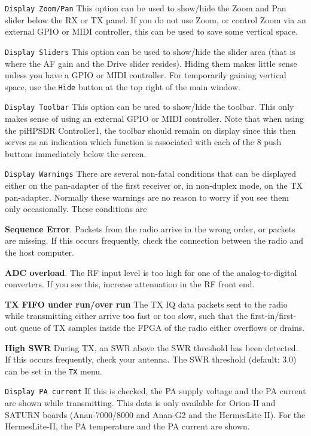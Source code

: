 \documentclass[12pt]{book}
\def\rett#1{\texttt{\color{red}#1}}
\def\bltt#1{\texttt{\color{blue}#1}}
\def\pH{pi\-HPSDR\xspace}
\begin{document}
 \rett{Display Zoom/Pan} This option can be used to show/hide the Zoom and
 Pan slider below the RX or TX panel. If you do not use Zoom, or control
 Zoom via an external GPIO or MIDI controller, this can be used to save
 some vertical space.

 \rett{Display Sliders} This option can be used to show/hide the slider area
 (that is where the AF gain and the Drive slider resides).
 Hiding them makes little sense unless you
 have a GPIO or MIDI controller. For temporarily gaining vertical space,
 use the \rett{Hide} button at the top right of the main window.

 \rett{Display Toolbar} This option can be used to show/hide the toolbar. This
 only makes sense of using an external GPIO or MIDI controller. Note that
 when using the \pH Controller1, the toolbar should remain on display since
 this then serves as an indication which function is associated with each of
 the 8 push buttons immediately below the screen.

\rett{Display Warnings} There are several non-fatal conditions that can
be displayed either on the pan-adapter of the first receiver or, in non-duplex
mode, on the TX pan-adapter. Normally these warnings are no reason to worry
if you see them  only occasionally. These conditions are

\textbf{Sequence Error}. Packets from the radio arrive in the wrong order, or packets
are missing. If this occurs frequently, check the connection between the radio and
the host computer.

\textbf{ADC overload}. The RF input level is too high for one of the analog-to-digital
converters. If you see this, increase attenuation in the RF front end.

\textbf{TX FIFO under run/over run} The TX IQ data packets sent to the radio while transmitting
either arrive too fast or too slow, such that the first-in/first-out queue of TX samples
inside the FPGA of the radio either overflows or drains.

\textbf{High SWR} During TX, an SWR above the SWR threshold has been detected. If this occurs
frequently, check your antenna. The SWR threshold (default: 3.0) can be set in the
\bltt{TX} menu.

\rett{Display PA current} If this is checked, the PA supply voltage and the PA current
are shown while transmitting. This data is only available for Orion-II and SATURN boards
(Anan-7000/8000 and Anan-G2 and the HermesLite-II).
 For the HermesLite-II, the PA temperature and the PA current are shown.
\end{document}
